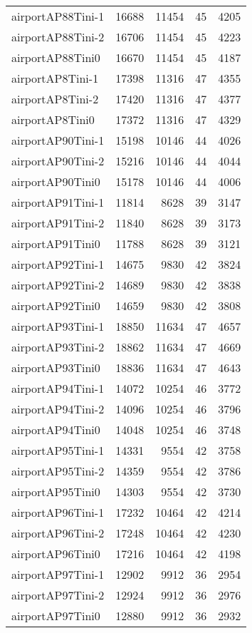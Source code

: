 \begin{longtable}{lrrrr}
airportAP88Tini-1 & 16688 & 11454 & 45 & 4205 \\
airportAP88Tini-2 & 16706 & 11454 & 45 & 4223 \\
airportAP88Tini0 & 16670 & 11454 & 45 & 4187 \\
airportAP8Tini-1 & 17398 & 11316 & 47 & 4355 \\
airportAP8Tini-2 & 17420 & 11316 & 47 & 4377 \\
airportAP8Tini0 & 17372 & 11316 & 47 & 4329 \\
airportAP90Tini-1 & 15198 & 10146 & 44 & 4026 \\
airportAP90Tini-2 & 15216 & 10146 & 44 & 4044 \\
airportAP90Tini0 & 15178 & 10146 & 44 & 4006 \\
airportAP91Tini-1 & 11814 & 8628 & 39 & 3147 \\
airportAP91Tini-2 & 11840 & 8628 & 39 & 3173 \\
airportAP91Tini0 & 11788 & 8628 & 39 & 3121 \\
airportAP92Tini-1 & 14675 & 9830 & 42 & 3824 \\
airportAP92Tini-2 & 14689 & 9830 & 42 & 3838 \\
airportAP92Tini0 & 14659 & 9830 & 42 & 3808 \\
airportAP93Tini-1 & 18850 & 11634 & 47 & 4657 \\
airportAP93Tini-2 & 18862 & 11634 & 47 & 4669 \\
airportAP93Tini0 & 18836 & 11634 & 47 & 4643 \\
airportAP94Tini-1 & 14072 & 10254 & 46 & 3772 \\
airportAP94Tini-2 & 14096 & 10254 & 46 & 3796 \\
airportAP94Tini0 & 14048 & 10254 & 46 & 3748 \\
airportAP95Tini-1 & 14331 & 9554 & 42 & 3758 \\
airportAP95Tini-2 & 14359 & 9554 & 42 & 3786 \\
airportAP95Tini0 & 14303 & 9554 & 42 & 3730 \\
airportAP96Tini-1 & 17232 & 10464 & 42 & 4214 \\
airportAP96Tini-2 & 17248 & 10464 & 42 & 4230 \\
airportAP96Tini0 & 17216 & 10464 & 42 & 4198 \\
airportAP97Tini-1 & 12902 & 9912 & 36 & 2954 \\
airportAP97Tini-2 & 12924 & 9912 & 36 & 2976 \\
airportAP97Tini0 & 12880 & 9912 & 36 & 2932 \\

\end{longtable}
